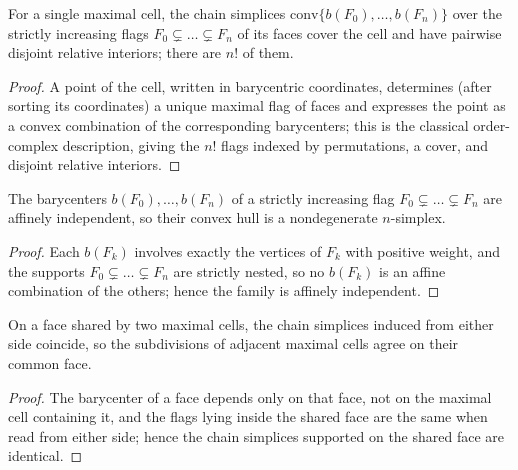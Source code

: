 \begin{lemma}
    \label{lem:bary-chain-cover}
    For a single maximal cell, the chain simplices
    $\mathrm{conv}\{b(F_0), \dots, b(F_n)\}$ over the strictly increasing flags
    $F_0 \subsetneq \dots \subsetneq F_n$ of its faces cover the cell and have
    pairwise disjoint relative interiors; there are $n!$ of them.
\end{lemma}
\begin{proof}
    A point of the cell, written in barycentric coordinates, determines (after
    sorting its coordinates) a unique maximal flag of faces and expresses the
    point as a convex combination of the corresponding barycenters; this is the
    classical order-complex description, giving the $n!$ flags indexed by
    permutations, a cover, and disjoint relative interiors.
\end{proof}

\begin{lemma}
    \label{lem:bary-chain-indep}
    The barycenters $b(F_0), \dots, b(F_n)$ of a strictly increasing flag
    $F_0 \subsetneq \dots \subsetneq F_n$ are affinely independent, so their
    convex hull is a nondegenerate $n$-simplex.
\end{lemma}
\begin{proof}
    Each $b(F_k)$ involves exactly the vertices of $F_k$ with positive weight,
    and the supports $F_0 \subsetneq \dots \subsetneq F_n$ are strictly nested, so
    no $b(F_k)$ is an affine combination of the others; hence the family is
    affinely independent.
\end{proof}

\begin{lemma}
    \label{lem:bary-face-to-face}
    \leanok
    On a face shared by two maximal cells, the chain simplices induced from
    either side coincide, so the subdivisions of adjacent maximal cells agree on
    their common face.
\end{lemma}
\begin{proof}
    The barycenter of a face depends only on that face, not on the maximal cell
    containing it, and the flags lying inside the shared face are the same when
    read from either side; hence the chain simplices supported on the shared face
    are identical.
\end{proof}

